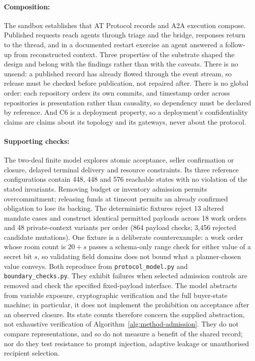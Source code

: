 \paragraph{Composition:} The sandbox establishes that AT Protocol records and A2A execution compose. Published requests reach agents through triage and the bridge, responses return to the thread, and in a documented restart exercise an agent answered a follow-up from reconstructed context. Three properties of the substrate shaped the design and belong with the findings rather than with the caveats. There is no unsend: a published record has already flowed through the event stream, so release must be checked before publication, not repaired after. There is no global order: each repository orders its own commits, and timestamp order across repositories is presentation rather than causality, so dependency must be declared by reference. And C6 is a deployment property, so a deployment's confidentiality claims are claims about its topology and its gateways, never about the protocol.

\paragraph{Supporting checks:} The two-deal finite model explores atomic acceptance, seller confirmation or closure, delayed terminal delivery and resource constraints. Its three reference configurations contain 448, 448 and 576 reachable states with no violation of the stated invariants. Removing budget or inventory admission permits overcommitment; releasing funds at timeout permits an already confirmed obligation to lose its backing. The deterministic fixtures reject 13 altered mandate cases and construct identical permitted payloads across 18 work orders and 48 private-context variants per order (864 payload checks; 3,456 rejected candidate mutations). One fixture is a deliberate counterexample: a work order whose room count is $20+s$ passes a schema-only range check for either value of a secret bit $s$, so validating field domains does not bound what a planner-chosen value conveys. Both reproduce from \texttt{protocol\_model.py} and \texttt{boundary\_checks.py}. They exhibit failures when selected admission controls are removed and check the specified fixed-payload interface. The model abstracts from variable exposure, cryptographic verification and the full buyer-state machine; in particular, it does not implement the prohibition on acceptance after an observed closure. Its state counts therefore concern the supplied abstraction, not exhaustive verification of Algorithm~\ref{alg:method-admission}. They do not compare representations, and so do not measure a benefit of the shared record; nor do they test resistance to prompt injection, adaptive leakage or unauthorised recipient selection.


